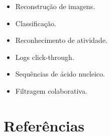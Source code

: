 \documentclass[a4paper,10pt]{article}
\theoremstyle{plain}
\begin{document}
\begin{itemize} \itemsep0pt
  \item Reconstrução de imagens.
  \item Classificação.
  \item Reconhecimento de atividade.
  \item Logs click-through.
  \item Sequências de ácido nucleico.
  \item Filtragem colaborativa.
\end{itemize}

\newpage

\section{Referências}

\printbibliography[title={Artigos},type=article]
\printbibliography[title={Websites},type=misc]
\end{document}
